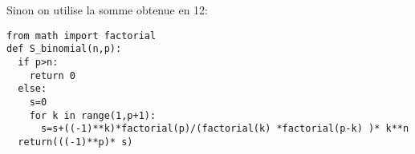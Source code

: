 \begin{correction}
\begin{enumerate}
\begin{enumerate}
\begin{lstlisting}
\end{lstlisting}

Sinon on utilise la somme obtenue en 12: 
\begin{lstlisting}
from math import factorial
def S_binomial(n,p):
  if p>n:
    return 0
  else: 
    s=0
    for k in range(1,p+1):
      s=s+((-1)**k)*factorial(p)/(factorial(k) *factorial(p-k) )* k**n
  return(((-1)**p)* s)
\end{lstlisting}
\end{enumerate}
\end{enumerate}
\end{correction}